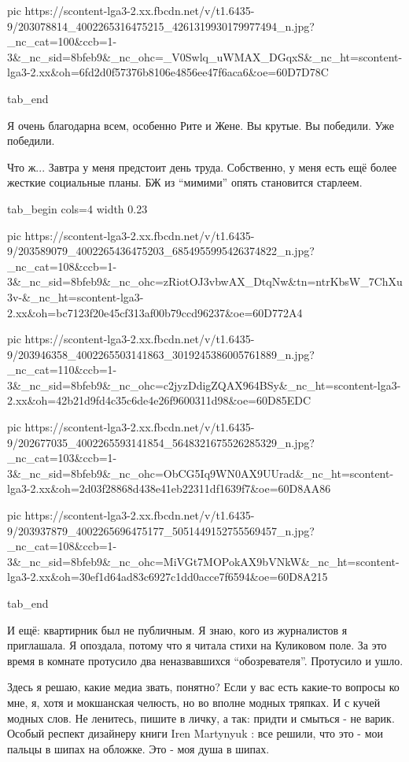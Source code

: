      pic https://scontent-lga3-2.xx.fbcdn.net/v/t1.6435-9/203078814_4002265316475215_4261319930179977494_n.jpg?_nc_cat=100&ccb=1-3&_nc_sid=8bfeb9&_nc_ohc=_V0Swlq_uWMAX_DGqxS&_nc_ht=scontent-lga3-2.xx&oh=6fd2d0f57376b8106e4856ee47f6aca6&oe=60D7D78C

  tab_end
\fi


Я очень благодарна всем, особенно Рите и Жене. Вы крутые. Вы победили. Уже победили.

Что ж... Завтра у меня предстоит день труда. Собственно, у меня есть ещё более
жесткие социальные планы. БЖ из \enquote{мимими} опять становится старлеем.


\ifcmt
  tab_begin cols=4
     width 0.23

     pic https://scontent-lga3-2.xx.fbcdn.net/v/t1.6435-9/203589079_4002265436475203_6854955995426374822_n.jpg?_nc_cat=108&ccb=1-3&_nc_sid=8bfeb9&_nc_ohc=zRiotOJ3vbwAX_DtqNw&tn=ntrKbsW_7ChXu3v-&_nc_ht=scontent-lga3-2.xx&oh=bc7123f20e45cf313af00b79ccd96237&oe=60D772A4

     pic https://scontent-lga3-2.xx.fbcdn.net/v/t1.6435-9/203946358_4002265503141863_3019245386005761889_n.jpg?_nc_cat=110&ccb=1-3&_nc_sid=8bfeb9&_nc_ohc=c2jyzDdigZQAX964BSy&_nc_ht=scontent-lga3-2.xx&oh=42b21d9fd4c35c6de4e26f9600311d98&oe=60D85EDC

     pic https://scontent-lga3-2.xx.fbcdn.net/v/t1.6435-9/202677035_4002265593141854_5648321675526285329_n.jpg?_nc_cat=103&ccb=1-3&_nc_sid=8bfeb9&_nc_ohc=ObCG5Iq9WN0AX9UUrad&_nc_ht=scontent-lga3-2.xx&oh=2d03f28868d438e41eb22311df1639f7&oe=60D8AA86

     pic https://scontent-lga3-2.xx.fbcdn.net/v/t1.6435-9/203937879_4002265696475177_5051449152755569457_n.jpg?_nc_cat=108&ccb=1-3&_nc_sid=8bfeb9&_nc_ohc=MiVGt7MOPokAX9bVNkW&_nc_ht=scontent-lga3-2.xx&oh=30ef1d64ad83c6927c1dd0acce7f6594&oe=60D8A215

  tab_end
\fi


И ещё: квартирник был не публичным. Я знаю, кого из журналистов я приглашала. Я
опоздала, потому что я читала стихи на Куликовом поле. За это время в комнате
протусило два неназвавшихся \enquote{обозревателя}. Протусило и ушло. 

Здесь я решаю, какие медиа звать, понятно? Если у вас есть какие-то вопросы ко
мне, я, хотя и мокшанская челюсть, но во вполне модных тряпках. И с кучей
модных слов. Не ленитесь, пишите в личку, а так: придти и смыться - не варик.
Особый респект дизайнеру книги Iren Martynyuk : все решили, что это - мои
пальцы в шипах на обложке. Это - моя душа в шипах.

